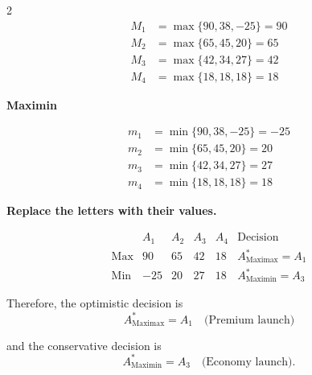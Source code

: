 {\begin{multicols}{2}
			\[
			\begin{array}{ll}
				M_1 &= \max\{90,38,-25\}=90\\
				M_2 &= \max\{65,45,20\}=65\\
				M_3 &= \max\{42,34,27\}=42\\
				M_4 &= \max\{18,18,18\}=18
			\end{array}
			\]
			
			\textbf{Maximin}
			
			\[
			\begin{array}{ll}
				m_1 &= \min\{90,38,-25\}=-25\\
				m_2 &= \min\{65,45,20\}=20\\
				m_3 &= \min\{42,34,27\}=27\\
				m_4 &= \min\{18,18,18\}=18
			\end{array}
			\]
			
			\columnbreak
			
			\textbf{Replace the letters with their values.}
			
			\[
			\begin{array}{c|ccccc}
				& A_1 & A_2 & A_3 & A_4 & \text{Decision}\\
				\hline
				\text{Max} &
				90 & 65 & 42 & 18 &
				A^*_{\mathrm{Maximax}}=A_1
				\\
				\text{Min} &
				-25 & 20 & 27 & 18 &
				A^*_{\mathrm{Maximin}}=A_3
			\end{array}
			\]
			
			Therefore, the optimistic decision is
			\[
			A^*_{\mathrm{Maximax}}=A_1
			\quad\text{(Premium launch)}
			\]
			
			and the conservative decision is
			\[
			A^*_{\mathrm{Maximin}}=A_3
			\quad\text{(Economy launch)}.
			\]
			
		\end{multicols}
		
	}
	

